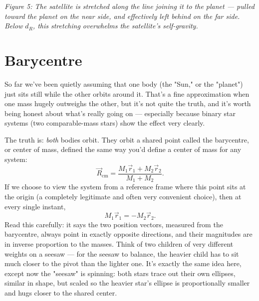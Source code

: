 \documentclass[11pt]{article}
\begin{document}
\begin{center}
\end{center}
\begin{center}\textit{Figure 5: The satellite is stretched along the line joining it to the
planet --- pulled toward the planet on the near side, and effectively left behind on the far side.
Below $d_R$, this stretching overwhelms the satellite's self-gravity.}\end{center}

\section{Barycentre}

So far we've been quietly assuming that one body (the "Sun," or the "planet") just sits still
while the other orbits around it. That's a fine approximation when one mass hugely outweighs the
other, but it's not quite the truth, and it's worth being honest about what's really going on ---
especially because binary star systems (two comparable-mass stars) show the effect very clearly.

The truth is: \emph{both} bodies orbit. They orbit a shared point called the barycentre, or center
of mass, defined the same way you'd define a center of mass for any system:
\[
\vec R_{\text{cm}} = \frac{M_1\vec r_1+M_2\vec r_2}{M_1+M_2}.
\]
If we choose to view the system from a reference frame where this point sits at the origin (a
completely legitimate and often very convenient choice), then at every single instant,
\[
M_1\vec r_1 = -M_2\vec r_2.
\]
Read this carefully: it says the two position vectors, measured from the barycentre, always point
in exactly opposite directions, and their magnitudes are in inverse proportion to the masses. Think
of two children of very different weights on a seesaw --- for the seesaw to balance, the heavier
child has to sit much closer to the pivot than the lighter one. It's exactly the same idea here,
except now the "seesaw" is spinning: both stars trace out their own ellipses, similar in shape,
but scaled so the heavier star's ellipse is proportionally smaller and hugs closer to the shared
center.
\end{document}
